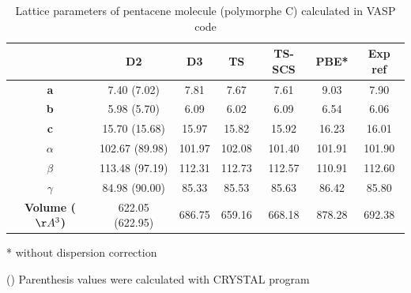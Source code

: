  	\begin{table}[H]
 		\caption{Lattice parameters of pentacene molecule (polymorphe C) calculated in VASP code} \label{table-pentaC}
 		\begin{center}
 			\begin{threeparttable}
 			\begin{tabular}{c c c c c c c}
 				\toprule
 				& \textbf{D2} & \textbf{D3} & \textbf{TS} & \textbf{TS-SCS} & \textbf{PBE*} & \textbf{Exp} ref\cite{campbell1961crystal} \\
 				\midrule
 				\textbf{a} &7.40 (7.02) & 7.81 & 7.67 & 7.61 & 9.03 & 7.90\\
 				\textbf{b}& 5.98 (5.70) & 6.09 & 6.02 & 6.09 & 6.54 & 6.06 \\
 				\textbf{c}& 15.70 (15.68) & 15.97 & 15.82 & 15.92 & 16.23 & 16.01 \\
 				\textbf{$\alpha$} & 102.67 (89.98) & 101.97 & 102.08 & 101.40 & 101.91 & 101.90\\
 				\textbf{$\beta$} & 113.48 (97.19) & 112.31 & 112.73 & 112.57 & 110.91 & 112.60\\
 				\textbf{$\gamma$} &84.98 (90.00) & 85.33 & 85.53 & 85.63 & 86.42 & 85.80\\
 				\textbf{Volume ($\AA^{3}$)} & 622.05 (622.95) & 686.75 & 659.16 & 668.18  & 878.28 & 692.38\\
 				\bottomrule
 			\end{tabular}
 			
 				\begin{tablenotes}
 					\item[*] without dispersion correction
 					\item[()] Parenthesis values were calculated with CRYSTAL program
 				\end{tablenotes}
 			\end{threeparttable}
 		\end{center}
 	\end{table}


